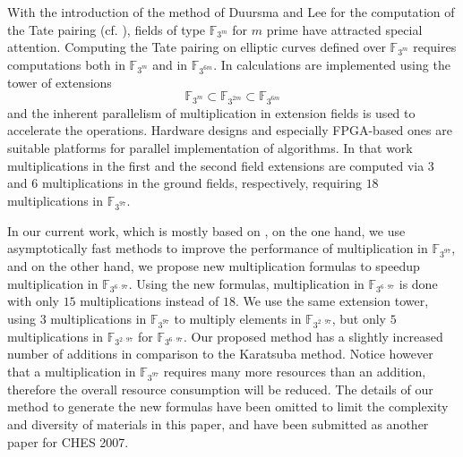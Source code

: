 \documentclass{article}
\newcommand{\F}{\mathbb{F}}
\begin{document}
With the introduction of the method of Duursma and Lee for the
computation of the Tate pairing (cf. \cite{duulee03}), fields of type
$\F_{3^{m}}$ for $m$ prime have attracted special attention.
Computing the Tate pairing on elliptic curves defined over
$\F_{3^{m}}$ requires computations both in $\F_{3^m}$ and in
$\F_{3^{6m}}$.
In \cite{kermar05} calculations are implemented using the tower of
extensions $$\F_{3^m}\subset\F_{3^{2m}}\subset\F_{3^{6m}}$$ and the
inherent parallelism of multiplication in extension fields is used to
accelerate the operations. 
Hardware designs and especially FPGA-based ones are suitable platforms
for parallel implementation of algorithms.
In that work multiplications in the first and the second field
extensions are computed via $3$ and $6$ multiplications in the ground
fields, respectively, requiring $18$ multiplications in $\F_{3^{97}}$.

In our current work, which is mostly based on \cite{kermar05}, on the
one hand, we use asymptotically fast methods to improve the
performance of multiplication in $\F_{3^{97}}$, and on the other hand,
we propose new multiplication formulas to speedup multiplication in
$\F_{3^{6 \cdot 97}}$.
Using the new formulas, multiplication in $\F_{3^{6 \cdot 97}}$ is
done with only $15$ multiplications instead of $18$. 
We use the same extension tower, using $3$ multiplications in
$\F_{3^{97}}$ to multiply elements in $\F_{3^{2 \cdot 97}}$, but only
$5$ multiplications in $\F_{3^{2 \cdot 97}}$ for $\F_{3^{6 \cdot
    97}}$.
Our proposed method has a slightly increased number of
additions in comparison to the Karatsuba method. Notice however that a
multiplication in $\F_{3^{97}}$ requires many more resources than an
addition, therefore the overall resource consumption will be reduced.
The details of our method to generate the new formulas have been
omitted to limit the complexity and diversity of materials in this
paper, and have been submitted as another paper for CHES 2007.
\end{document}
